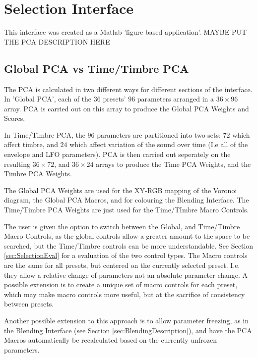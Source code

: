 \documentclass[11pt, oneside]{report}   	%
\begin{document}
\section{Selection Interface}\label{sec:SelectionDescription}
This interface was created as a Matlab 'figure based application'. MAYBE PUT THE PCA DESCRIPTION HERE
\subsection{Global PCA vs Time/Timbre PCA}\label{sec:GlobalTimeTimbre}
The PCA is calculated in two different ways for different sections of the interface. In 'Global PCA', each of the $36$ presets' $96$ parameters arranged in a $36 \times 96$ array. PCA is carried out on this array to produce the Global PCA Weights and Scores. 

In Time/Timbre PCA, the $96$ parameters are partitioned into two sets: $72$ which affect timbre, and $24$ which affect variation of the sound over time (I.e all of the envelope and LFO parameters). PCA is then carried out seperately on the resulting  $36 \times 72$, and $36 \times 24$ arrays to produce the Time PCA Weights, and the Timbre PCA Weights. 

The Global PCA Weights are used for the XY-RGB mapping of the Voronoi diagram, the Global PCA Macros, and for colouring the Blending Interface. The Time/Timbre PCA Weights are just used for the Time/TImbre Macro Controls.

The user is given the option to switch between the Global, and Time/Timbre Macro Controls, as the global controls allow a greater amount to the space to be searched, but the Time/Timbre controls can be more understandable. See Section \ref{sec:SelectionEval} for a evaluation of the two control types.
The Macro controls are the same for all presets, but centered on the currently selected preset. I.e. they allow a relative change of parameters not an absolute parameter change. A possible extension is to create a unique set of macro controls for each preset, which may make macro controls more useful, but at the sacrifice of consistency between presets.

Another possible extension to this approach is to allow parameter freezing, as in the Blending Interface (see Section \ref{sec:BlendingDescription}), and have the PCA Macros automatically be recalculated based on the currently unfrozen parameters.
\end{document}
